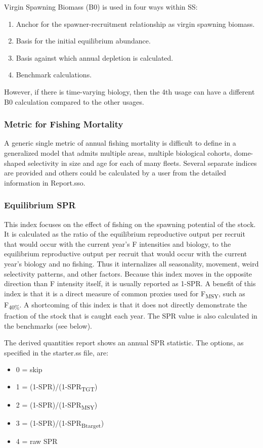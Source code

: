 Virgin Spawning Biomass (B0) is used in four ways within SS:
\begin{enumerate}
	\item Anchor for the spawner-recruitment relationship as virgin spawning biomass.
	\item Basis for the initial equilibrium abundance. 
	\item Basis against which annual depletion is calculated.
	\item Benchmark calculations.
\end{enumerate}
However, if there is time-varying biology, then the 4th usage can have a different B0 calculation compared to the other usages.

\subsubsection{Metric for Fishing Mortality}
A generic single metric of annual fishing mortality is difficult to define in a generalized model that admits multiple areas, multiple biological cohorts, dome-shaped selectivity in size and age for each of many fleets. Several separate indices are provided and others could be calculated by a user from the detailed information in Report.sso.

\subsubsection{Equilibrium SPR}
This index focuses on the effect of fishing on the spawning potential of the stock. It is calculated as the ratio of the equilibrium reproductive output per recruit that would occur with the current year's F intensities and biology, to the equilibrium reproductive output per recruit that would occur with the current year's biology and no fishing.  Thus it internalizes all seasonality, movement, weird selectivity patterns, and other factors. Because this index moves in the opposite direction than F intensity itself, it is usually reported as 1-SPR. A benefit of this index is that it is a direct measure of common proxies used for F\textsubscript{MSY}, such as F\textsubscript {40\%}. A shortcoming of this index is that it does not directly demonstrate the fraction of the stock that is caught each year. The SPR value is also calculated in the benchmarks (see below). 

The derived quantities report shows an annual SPR statistic.  The options, as specified in the starter.ss file, are:
\begin{itemize}
	\item 0 = skip
	\item 1 = (1-SPR)/(1-SPR\textsubscript{TGT})
	\item 2 = (1-SPR)/(1-SPR\textsubscript{MSY})
	\item 3 = (1-SPR)/(1-SPR\textsubscript{Btarget})
	\item 4 = raw SPR
\end{itemize}

